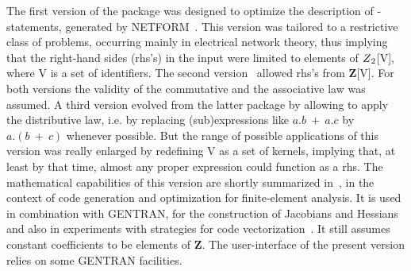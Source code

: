 The first version of the package was designed to optimize the
description of {\REDUCE}-statements, generated by
NETFORM~\cite{Smit:81,Smit:82}. This
version was tailored to a restrictive class of problems, occurring
mainly in electrical network theory, thus implying that the right-hand
sides (rhs's) in the input were limited to elements of ${{\rm {\bf }}
Z}_2$[V], where V is a set of identifiers.  The second
version~\cite{vanHulzen:83}
allowed rhs's from {\bf Z}[V]. For both versions the validity of the
commutative and the associative law was assumed.  A third version
evolved from the latter package by allowing to apply the distributive
law, i.e. by replacing (sub)expressions like $a.b\ +\ a.c$ by $a.(b\
+\ c)$ whenever possible.  But the range of possible applications of
this version was really enlarged by redefining V as a set of kernels,
implying that, at least by that time, almost any proper {\REDUCE}
expression could function as a rhs.  The mathematical capabilities of
this version are shortly summarized in~\cite{Wang:84}, in the context of code
generation and optimization for finite-element analysis.  It is used
\index{GENTRAN ! with SCOPE package}
in combination with GENTRAN, for the construction of Jacobians and
Hessians~\cite{Heuvel:89} and also in experiments with strategies for code
vectorization~\cite{Goldman:89}. It still assumes constant coefficients to be
elements of {\bf Z}.  The user-interface of the present version relies
on some GENTRAN facilities.

